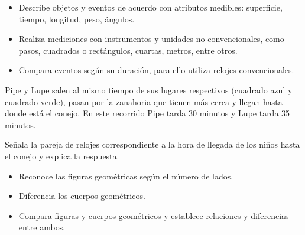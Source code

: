 

\evidencias

\begin{itemize}
  \item Describe objetos y eventos de acuerdo con atributos medibles: superficie, tiempo, longitud, peso, ángulos.
  \item Realiza mediciones con instrumentos y unidades no convencionales, como pasos, cuadrados o rectángulos, cuartas, metros, entre otros.
  \item Compara eventos según su duración, para ello utiliza relojes convencionales.
\end{itemize}

\ejemplo

Pipe y Lupe salen al mismo tiempo de sus lugares respectivos (cuadrado azul y cuadrado verde), pasan por la zanahoria que tienen más cerca y llegan hasta donde está el conejo. En este recorrido Pipe tarda 30 minutos y Lupe tarda 35 minutos.

Señala la pareja de relojes correspondiente a la hora de llegada de los niños hasta el conejo y explica la respuesta.




\evidencias

\begin{itemize}
  \item Reconoce las figuras geométricas según el número de lados.
  \item Diferencia los cuerpos geométricos.
  \item Compara figuras y cuerpos geométricos y establece relaciones y diferencias entre ambos.
\end{itemize}

\ejemplo

